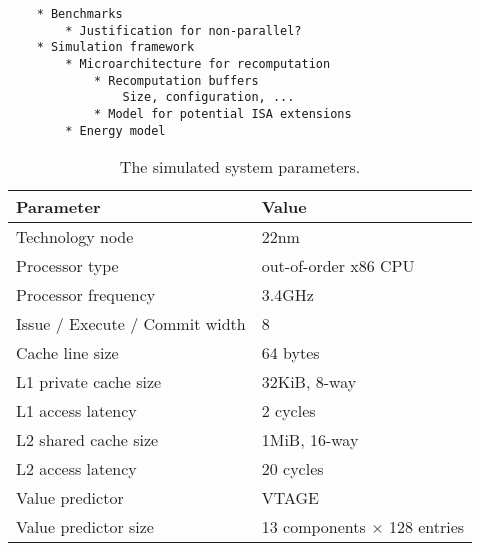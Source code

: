 \begin{verbatim}
    * Benchmarks 
        * Justification for non-parallel?
    * Simulation framework 
        * Microarchitecture for recomputation
            * Recomputation buffers
                Size, configuration, ...
            * Model for potential ISA extensions
        * Energy model
\end{verbatim}

\begin{table}
  \centering
  \caption{The simulated system parameters.}
  \label{table:sim-params}
  \begin{tabular}{ l | l }
    \hline
    Parameter & Value\\
    \hline
    Technology node                           & 22nm \\
    Processor type                            & out-of-order x86 CPU \\
    Processor frequency                       & 3.4GHz \\
    Issue / Execute / Commit width            & 8 \\
    Cache line size                           & 64 bytes \\
    L1 private cache size                     & 32KiB, 8-way \\
    L1 access latency                         & 2 cycles \\
    L2 shared cache size                      & 1MiB, 16-way \\
    L2 access latency                         & 20 cycles \\
    Value predictor                           & VTAGE \\
    Value predictor size                      & 13 components $\times$ 128 entries \\
    \hline
  \end{tabular}
\end{table}

